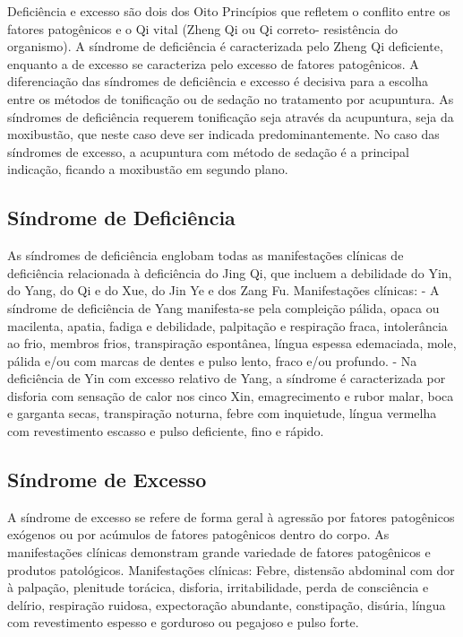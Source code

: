 \documentclass[12pt,oneside,a4paper]{book} %
\begin{document}
Deficiência e excesso são dois dos Oito Princípios que refletem o conflito entre os fatores patogênicos e o Qi vital (Zheng Qi ou Qi correto- resistência do organismo). A síndrome de deficiência é caracterizada pelo Zheng Qi deficiente, enquanto a de excesso se caracteriza pelo excesso de fatores patogênicos. 
A diferenciação das síndromes de deficiência e excesso é decisiva para a escolha entre os métodos de tonificação ou de sedação no tratamento por acupuntura. As síndromes de deficiência requerem tonificação seja através da acupuntura, seja da moxibustão, que neste caso deve ser indicada predominantemente.
No caso das síndromes de excesso, a acupuntura com método de sedação é a principal indicação, ficando a moxibustão em segundo plano.

\subsection{Síndrome de Deficiência} 
As síndromes de deficiência englobam todas as manifestações clínicas de deficiência relacionada à deficiência do Jing Qi, que incluem a debilidade do Yin, do Yang, do Qi e do Xue, do Jin Ye e dos Zang Fu. 
Manifestações clínicas: 
- A síndrome de deficiência de Yang manifesta-se pela compleição pálida, opaca ou macilenta, apatia, fadiga e debilidade, palpitação e respiração fraca, intolerância ao frio, membros frios, transpiração espontânea, língua espessa edemaciada, mole, pálida e/ou com marcas de dentes e pulso lento, fraco e/ou profundo.
- Na deficiência de Yin com excesso relativo de Yang, a síndrome é caracterizada por disforia com sensação de calor nos cinco Xin, emagrecimento e rubor malar, boca e garganta secas, transpiração noturna, febre com inquietude, língua vermelha com revestimento escasso e pulso deficiente, fino e rápido.

\subsection{Síndrome de Excesso}
A síndrome de excesso se refere de forma geral à agressão por fatores patogênicos exógenos ou por acúmulos de fatores patogênicos dentro do corpo. As manifestações clínicas demonstram grande variedade de fatores patogênicos e produtos patológicos. 
Manifestações clínicas: Febre, distensão abdominal com dor à palpação, plenitude torácica, disforia, irritabilidade, perda de consciência e delírio, respiração ruidosa, expectoração abundante, constipação, disúria, língua com revestimento espesso e gorduroso ou pegajoso e pulso forte.
\end{document}
